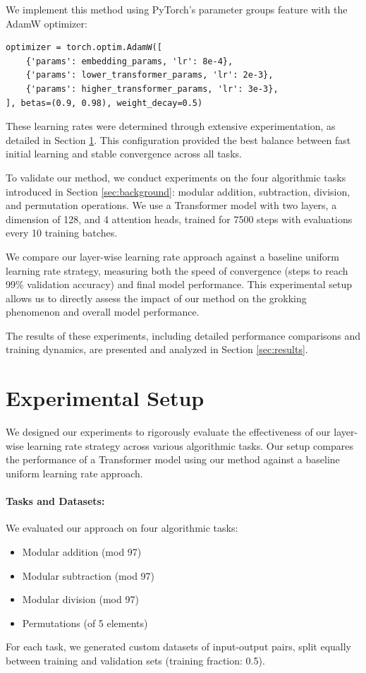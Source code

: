 \documentclass{article} %
\begin{document}
We implement this method using PyTorch's parameter groups feature with the AdamW optimizer:

\begin{verbatim}
optimizer = torch.optim.AdamW([
    {'params': embedding_params, 'lr': 8e-4},
    {'params': lower_transformer_params, 'lr': 2e-3},
    {'params': higher_transformer_params, 'lr': 3e-3},
], betas=(0.9, 0.98), weight_decay=0.5)
\end{verbatim}

These learning rates were determined through extensive experimentation, as detailed in Section \ref{sec:experimental}. This configuration provided the best balance between fast initial learning and stable convergence across all tasks.

To validate our method, we conduct experiments on the four algorithmic tasks introduced in Section \ref{sec:background}: modular addition, subtraction, division, and permutation operations. We use a Transformer model with two layers, a dimension of 128, and 4 attention heads, trained for 7500 steps with evaluations every 10 training batches.

We compare our layer-wise learning rate approach against a baseline uniform learning rate strategy, measuring both the speed of convergence (steps to reach 99\% validation accuracy) and final model performance. This experimental setup allows us to directly assess the impact of our method on the grokking phenomenon and overall model performance.

The results of these experiments, including detailed performance comparisons and training dynamics, are presented and analyzed in Section \ref{sec:results}.

\section{Experimental Setup}
\label{sec:experimental}

We designed our experiments to rigorously evaluate the effectiveness of our layer-wise learning rate strategy across various algorithmic tasks. Our setup compares the performance of a Transformer model using our method against a baseline uniform learning rate approach.

\paragraph{Tasks and Datasets:} We evaluated our approach on four algorithmic tasks:
\begin{itemize}
    \item Modular addition (mod 97)
    \item Modular subtraction (mod 97)
    \item Modular division (mod 97)
    \item Permutations (of 5 elements)
\end{itemize}
For each task, we generated custom datasets of input-output pairs, split equally between training and validation sets (training fraction: 0.5).
\end{document}
